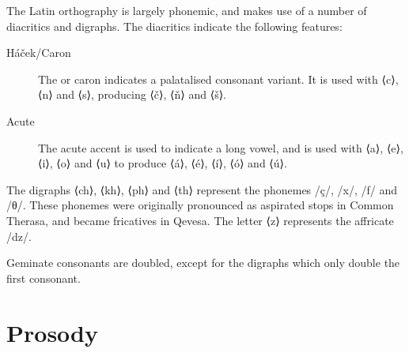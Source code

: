 \documentclass[grammar]{subfiles}
\begin{document}
  The Latin orthography is largely phonemic, and makes use of a number of
  diacritics and digraphs.  The diacritics indicate the following features:

  \begin{description}
    \item[Háček/Caron] The  or caron indicates a palatalised
      consonant variant.  It is used with ⟨c⟩, ⟨n⟩ and ⟨s⟩, producing ⟨č⟩, ⟨ň⟩
      and ⟨š⟩.  
    \item[Acute] The acute accent is used to indicate a long vowel, and is used
      with ⟨a⟩, ⟨e⟩, ⟨i⟩, ⟨o⟩ and ⟨u⟩ to produce ⟨á⟩, ⟨é⟩, ⟨í⟩, ⟨ó⟩ and ⟨ú⟩.  
  \end{description}

  The digraphs ⟨ch⟩, ⟨kh⟩, ⟨ph⟩ and ⟨th⟩ represent the phonemes /ç/, /x/, /f/
  and /θ/.  These phonemes were originally pronounced as aspirated stops in
  Common Therasa, and became fricatives in Qevesa.  The letter ⟨z⟩ represents
  the affricate /dz/.

  Geminate consonants are doubled, except for the digraphs which only double
  the first consonant.  



  \section{Prosody}
  \label{sec:prosody}
\end{document}
